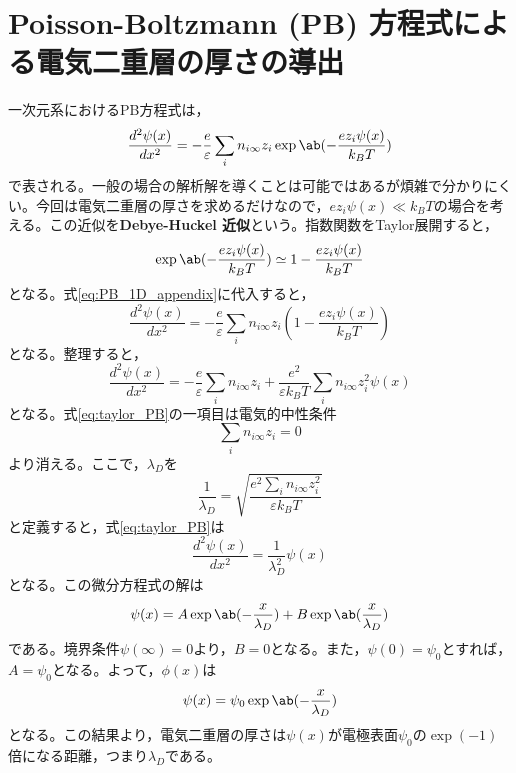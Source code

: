 \documentclass[autodetect-engine,dvi=dvipdfmx,a4paper,ja=standard,oneside,openany]{bxjsbook}
\begin{document}
\chapter{Poisson-Boltzmann (PB) 方程式による電気二重層の厚さの導出}
\label{sec:PB}
一次元系におけるPB方程式は，
\begin{equation}
  \frac{d^2\psi(x)}{dx^2} = -\frac{e}{\varepsilon}\sum_{i}n_{i\infty}z_i\exp\ab(-\frac{ez_i\psi(x)}{k_BT})
  \label{eq:PB_1D_appendix}
\end{equation}
で表される。一般の場合の解析解を導くことは可能ではあるが煩雑で分かりにくい。今回は電気二重層の厚さを求めるだけなので，$ ez_i\psi(x)\ll k_B T$の場合を考える。この近似を\textbf{Debye-Huckel 近似}という。指数関数をTaylor展開すると，
\begin{equation}
  \exp\ab(-\frac{ez_i\psi(x)}{k_BT})\simeq 1-\frac{ez_i\psi(x)}{k_BT}
\end{equation}
となる。式\eqref{eq:PB_1D_appendix}に代入すると，
\begin{equation}
  \frac{d^2\psi(x)}{dx^2} = -\frac{e}{\varepsilon}\sum_{i}n_{i\infty}z_i\left(1-\frac{ez_i\psi(x)}{k_BT}\right)
\end{equation}
となる。整理すると，
\begin{equation}
  \frac{d^2\psi(x)}{dx^2} = -\frac{e}{\varepsilon}\sum_{i}n_{i\infty}z_i+\frac{e^2}{\varepsilon k_BT}\sum_{i}n_{i\infty}z_i^2\psi(x)
  \label{eq:taylor_PB}
\end{equation}
となる。式\eqref{eq:taylor_PB}の一項目は電気的中性条件
\begin{equation}
  \sum_{i}n_{i\infty}z_i=0
\end{equation}
より消える。ここで，$\lambda_D$を
\begin{equation}
  \frac{1}{\lambda_D}=\sqrt{\frac{e^2\sum_{i}n_{i\infty}z_i^2}{\varepsilon k_BT}}
\end{equation}
と定義すると，式\eqref{eq:taylor_PB}は
\begin{equation}
  \frac{d^2\psi(x)}{dx^2} = \frac{1}{\lambda_D^2}\psi(x)
\end{equation}
となる。この微分方程式の解は
\begin{equation}
  \psi(x)=A\exp\ab(-\frac{x}{\lambda_D})+B\exp\ab(\frac{x}{\lambda_D})
\end{equation}
である。境界条件$\psi(\infty)=0$より，$B=0$となる。また，$\psi(0)=\psi_0$とすれば，$A=\psi_0$となる。よって，$\phi(x)$は
\begin{equation}
  \psi(x)=\psi_0\exp\ab(-\frac{x}{\lambda_D})
\end{equation}
となる。この結果より，電気二重層の厚さは$\psi(x)$が電極表面$\psi_0$の$\exp(-1)$倍になる距離，つまり$\lambda_D$である。
\end{document}
